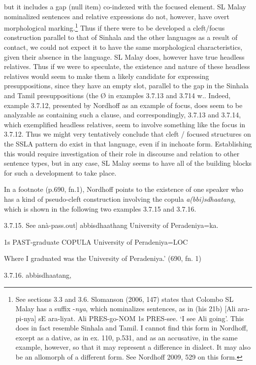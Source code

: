 \documentclass[letterpaper]{article}
\begin{document}
but it includes a gap (null item) co-indexed with the focused element. SL Malay nominalized sentences and relative expressions do not, however, have overt morphological marking.\footnote{See
  sections 3.3 and 3.6. Slomanson (2006, 147) states that Colombo SL Malay has a suffix -\textit{nya}, which nominalizes sentences, as in (his 21b) [Ali ara-pi-nya] sE ara-liyat. Ali PRES-go-NOM 1s PRES-see. `I see Ali going'.  This does in fact resemble Sinhala and Tamil. I cannot find this form in Nordhoff, except as a dative, as in ex. 110, p.531, and as an accusative, in the same example, however, so that it may represent a difference in dialect. It may also be an allomorph of a different form. See Nordhoff 2009, 529 on this form.
} 
Thus if there were to be developed a cleft/focus construction parallel to that of Sinhala and the other languages as a result of contact, we could not expect it to have the same morphological characteristics, given their absence in the language. SL Malay does, however have true headless relatives. Thus if we were to speculate, the existence and nature of these headless relatives would seem to make them a likely candidate for expressing presuppositions, since they have an empty slot, parallel to the gap in the Sinhala and Tamil presuppositions (the {\O} in examples 3.7.13 and 3.714 w.. Indeed, example 3.7.12, presented by Nordhoff as an example of focus, does seem to be analyzable as containing such a clause, and correspondingly, 3.7.13 and 3.7.14, which exemplified headless relatives, seem to involve something like the focus in 3.7.12. Thus we might very tentatively conclude that  cleft / focused structures on the SSLA pattern do exist in that language, even if in inchoate form. Establishing this would require investigation of their role in discourse and relation to other sentence types, but in any case, SL Malay seems to have all of the building blocks for such a development to take place.

 In a footnote (p.690, fn.1), Nordhoff points to the existence of one speaker who has a kind of pseudo-cleft construction involving the copula \textit{a(bbi)sdhaatang}, which is shown in the following two examples 3.7.15 and 3.7.16.

 3.7.15. 
\ea
\gll See anà-pass.out] abbisdhaathang University of Peradeniya=ka.

1s PAST-graduate COPULA University of Peradeniya=LOC

Where I graduated was the University of Peradeniya.' (690, fn. 1)

 3.7.16. 
\ea
{}  abbisdhaatang,
\end{document}
